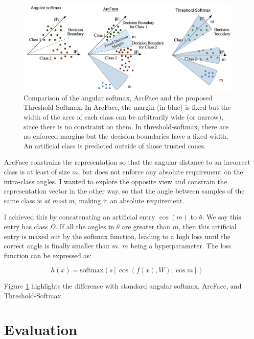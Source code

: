 \begin{figure}
    \centering
    \includegraphics[width=\columnwidth]{50-files/download.png}
    \caption{Comparison of the angular softmax, ArcFace and the proposed Threshold-Softmax. In ArcFace, the margin (in blue) is fixed but the width of the arcs of each class can be arbitrarily wide (or narrow), since there is no constraint on them. In threshold-softmax, there are no enforced margins but the decision boundaries have a fixed width. An artificial class is predicted outside of those trusted cones.}
    \label{fig:tsm}
\end{figure}

ArcFace constrains the representation so that the angular distance to an incorrect class is at least of size $m$, but does not enforce any absolute requirement on the intra-class angles. I wanted to explore the opposite view and constrain the representation vector in the other way, so that the angle between samples of the same class is \emph{at most} $m$, making it an absolute requirement.

I achieved this by concatenating an artificial entry $\cos(m)$ to $\theta$. We say this entry has class $\Omega$. If all the angles in $\theta$ are greater than $m$, then this artificial entry is maxed out by the softmax function, leading to a high loss until the correct angle is finally smaller than $m$. $m$ being a hyperparameter. The loss function can be expressed as:

\begin{equation}
    h(x) = \text{softmax}(s [\cos(f(x),W); \cos m])
\end{equation}

Figure \ref{fig:tsm} highlights the difference with standard angular softmax, ArcFace, and Threshold-Softmax.

\section{Evaluation}

